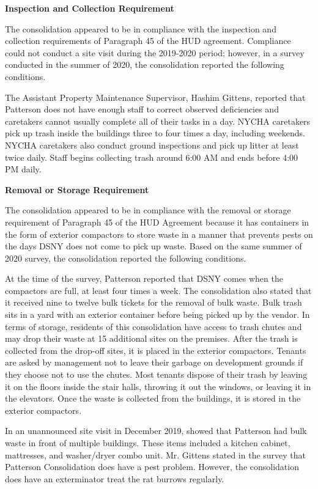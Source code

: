 
\textbf{Inspection and Collection Requirement}

The consolidation appeared to be in compliance with the inspection and collection requirements of Paragraph 45 of the HUD agreement. Compliance could not conduct a site visit during the 2019-2020 period; however, in a survey conducted in the summer of 2020, the consolidation reported the following conditions.

The Assistant Property Maintenance Supervisor, Hashim Gittens, reported that Patterson does not have enough staff to correct observed deficiencies and caretakers cannot usually complete all of their tasks in a day. NYCHA caretakers pick up trash inside the buildings three to four times a day, including weekends. NYCHA caretakers also conduct ground inspections and pick up litter at least twice daily. Staff begins collecting trash around 6:00 AM and ends before 4:00 PM daily.

\textbf{Removal or Storage Requirement}

The consolidation appeared to be in compliance with the removal or storage requirement of Paragraph  45 of the HUD Agreement because it has containers in the form of exterior compactors to store waste in a manner that prevents pests on the days DSNY does not come to pick up waste. Based on the same summer of 2020 survey, the consolidation reported the following conditions. 

At the time of the survey, Patterson reported that DSNY comes when the compactors are full, at least four times a week. The consolidation also stated that it received nine to twelve bulk tickets for the removal of bulk waste. Bulk trash sits in a yard with an exterior container before being picked up by the vendor. In terms of storage, residents of this consolidation have access to trash chutes and may drop their waste at 15 additional sites on the premises. After the trash is collected from the drop-off sites, it is placed in the exterior compactors. Tenants are asked by management not to leave their garbage on development grounds if they choose not to use the chutes. Most tenants dispose of their trash by leaving it on the floors inside the stair halls, throwing it out the windows, or leaving it in the elevators. Once the waste is collected from the buildings, it is stored in the exterior compactors.  

In an unannounced site visit in December 2019, showed that Patterson had bulk waste in front of multiple buildings. These items included  a kitchen cabinet, mattresses, and washer/dryer combo unit. Mr. Gittens stated in the survey that Patterson Consolidation does have a pest problem. However, the consolidation does have an exterminator treat the rat burrows regularly.


